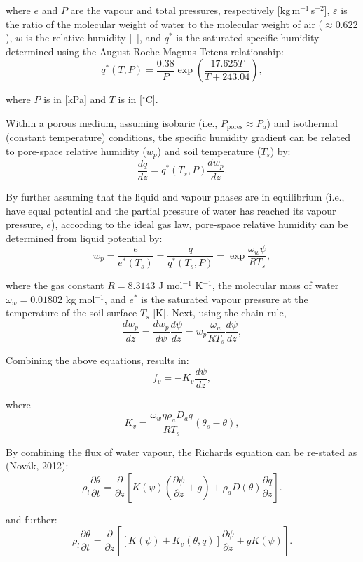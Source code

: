 \documentclass[10pt, letterpapr]{article}
\begin{document}
\noindent where $e$ and $P$ are the vapour and total pressures, respectively [kg\,m$^{-1}$\,s$^{-2}$], $\varepsilon$ is the ratio of the molecular weight of water to the molecular weight of air ($\approx 0.622$), $w$ is the relative humidity [--], and $q^*$ is the saturated specific humidity determined using the August-Roche-Magnus-Tetens relationship:
\[
	q^*(T,P)=\frac{0.38}{P}\exp\left(\frac{17.625T}{T+243.04}\right),
\]

\noindent where $P$ is in [kPa] and $T$ is in [$^\circ$C].

Within a porous medium, assuming isobaric (i.e., $P_\text{pores}\approx P_a$) and isothermal (constant temperature) conditions, the specific humidity gradient can be related to pore-space relative humidity ($w_p$) and soil temperature ($T_s$) by:
\[
	\frac{dq}{dz}=q^*(T_s,P)\frac{dw_p}{dz}.
\]

By further assuming that the liquid and vapour phases are in equilibrium (i.e., have equal potential and the partial pressure of water has reached its vapour pressure, $e$), according to the ideal gas law, pore-space relative humidity can be determined from liquid potential by:
\[ %
	w_p=\frac{e}{e^*(T_s)}=\frac{q}{q^*(T_s,P)}=\exp{\frac{\omega_w\psi}{RT_s}},
\]

\noindent where the gas constant $R=8.3143$ J mol$^{-1}$ K$^{-1}$, the molecular mass of water $\omega_w=0.01802$ kg mol$^{-1}$, and $e^*$ is the saturated vapour pressure at the temperature of the soil surface $T_s$ [K]. Next, using the chain rule,
\[
	\frac{dw_p}{dz}=\frac{dw_p}{d\psi}\frac{d\psi}{dz}=w_p\frac{\omega_w}{RT_s}\frac{d\psi}{dz},
\]

\noindent Combining the above equations, results in:
\[
	f_v=-K_v\frac{d\psi}{dz},
\]

\noindent where
\[
	K_v=\frac{\omega_w\eta\rho_aD_aq}{RT_s}\left(\theta_s-\theta\right),
\]

By combining the flux of water vapour, the Richards equation can be re-stated as (Nov\'ak, 2012): %
\[
	\rho_l\frac{\partial\theta}{\partial t}=\frac{\partial}{\partial z}\left[K(\psi)\left(\frac{\partial\psi}{\partial z}+g\right)+\rho_a D(\theta)\frac{\partial q}{\partial z}\right].
\]

\noindent and further:
\[
	\rho_l\frac{\partial\theta}{\partial t}=\frac{\partial}{\partial z}\left[\left[K(\psi)+K_v(\theta,q)\right]\frac{\partial\psi}{\partial z}+gK(\psi)\right].
\]




\end{document}
